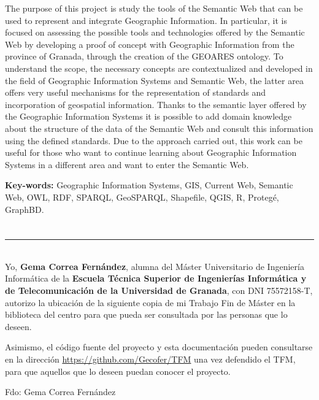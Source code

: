 The purpose of this project is study the tools of the Semantic Web that can be used to represent and integrate Geographic Information. In particular, it is focused on assessing the possible tools and technologies offered by the Semantic Web by developing a proof of concept with Geographic Information from the province of Granada, through the creation of the GEOARES ontology. To understand the scope, the necessary concepts are contextualized and developed in the field of Geographic Information Systems and Semantic Web, the latter area offers very useful mechanisms for the representation of standards and incorporation of geospatial information. Thanks to the semantic layer offered by the Geographic Information Systems it is possible to add domain knowledge about the structure of the data of the Semantic Web and consult this information using the defined standards. Due to the approach carried out, this work can be useful for those who want to continue learning about Geographic Information Systems in a different area and want to enter the Semantic Web.


\vspace{0.25in}

{\bf Key-words:} Geographic Information Systems, GIS, Current Web, Semantic Web, OWL, RDF, SPARQL, GeoSPARQL, Shapefile, QGIS, R, Protegé, GraphBD.

\chapter*{}
\thispagestyle{empty}

\noindent\rule[-1ex]{\textwidth}{2pt}\\[4.5ex]

Yo, \textbf{Gema Correa Fernández}, alumna del Máster Universitario de Ingeniería Informática de la \textbf{Escuela Técnica Superior de Ingenierías Informática y de Telecomunicación de la Universidad de Granada}, con DNI 75572158-T, autorizo la ubicación de la siguiente copia de mi Trabajo Fin de Máster en la biblioteca del centro para que pueda ser consultada por las personas que lo deseen.\newline

Asimismo, el código fuente del proyecto y esta documentación pueden consultarse en la dirección \url{https://github.com/Gecofer/TFM} una vez defendido el TFM, para que aquellos que lo deseen puedan conocer el proyecto.

\vspace{5cm}

\noindent Fdo: Gema Correa Fernández

